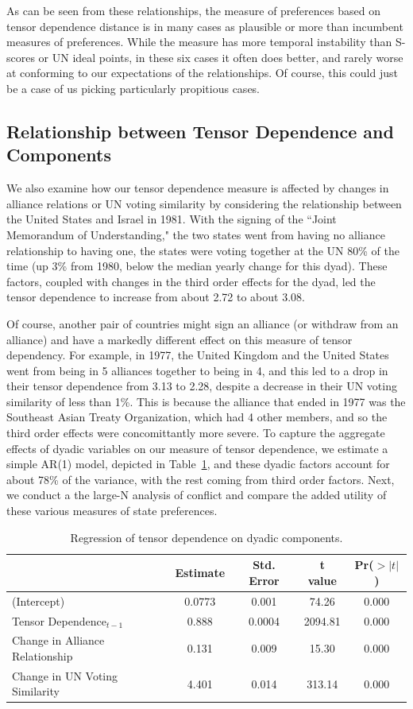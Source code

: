 \documentclass[12pt,pdflatex]{elsarticle}
\begin{document}
As can be seen from these relationships, the measure of preferences based on tensor dependence distance is in many cases as plausible or more than incumbent measures of preferences. While the measure has more temporal instability than S-scores or UN ideal points, in these six cases it often does better, and rarely worse at conforming to our expectations of the relationships. Of course, this could just be a case of us picking particularly propitious cases.

\subsection*{Relationship between Tensor Dependence and Components}

We also examine how our tensor dependence measure is affected by changes in alliance relations or UN voting similarity by considering the relationship between the United States and Israel in 1981. With the signing of the ``Joint Memorandum of Understanding," the two states went from having no alliance relationship to having one, the states were voting together at the UN 80\% of the time (up 3\% from 1980, below the median yearly change for this dyad). These factors, coupled with changes in the third order effects for the dyad, led the tensor dependence to increase from about 2.72 to about 3.08.

Of course, another pair of countries might sign an alliance (or withdraw from an alliance) and have a markedly different effect on this measure of tensor dependency. For example, in 1977, the United Kingdom and the United States went from being in 5 alliances together to being in 4, and this led to a drop in their tensor dependence from 3.13 to 2.28, despite a decrease in their UN voting similarity of less than 1\%. This is because the alliance that ended in 1977 was the Southeast Asian Treaty Organization, which had 4 other members, and so the third order effects were concomittantly more severe. To capture the aggregate effects of dyadic variables on our measure of tensor dependence, we estimate a simple AR(1) model, depicted in Table~\ref{tensor:ols}, and these dyadic factors account for about 78\% of the variance, with the rest coming from third order factors. Next, we conduct a the large-N analysis of conflict and compare the added utility of these various measures of state preferences.

\begin{table}[ht]
	\centering
	\begin{tabular}{lcccc}
		\hline
		& Estimate & Std. Error & t value & Pr($>|t|$) \\
		\hline
		(Intercept) & 0.0773 & 0.001 & 74.26 & 0.000 \\
		Tensor Dependence$_{t-1}$ & 0.888 & 0.0004 & 2094.81 & 0.000 \\
		Change in Alliance Relationship & 0.131 & 0.009 & 15.30 & 0.000 \\
		Change in UN Voting Similarity & 4.401 & 0.014 & 313.14 & 0.000 \\
		\hline
	\end{tabular}
	\caption{Regression of tensor dependence on dyadic components.}
	\label{tensor:ols}
\end{table}
\end{document}
